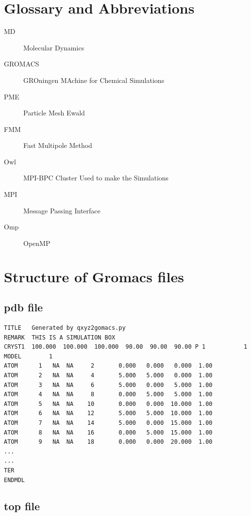 \documentclass[12pt,twoside,a4paper]{report}
\begin{document}
\begin{appendices}
\chapter{Glossary and Abbreviations}

\begin{description}


\item[MD]  Molecular Dynamics
\item[GROMACS] GROningen MAchine for Chemical Simulations
\item[PME] Particle Mesh Ewald
\item[FMM] Fast Multipole Method
\item[Owl] MPI-BPC Cluster Used to make the Simulations

\item[MPI] Message Passing Interface
\item[Omp] OpenMP

\end{description}


\chapter{Structure of Gromacs files}

\section{pdb file}

\begin{verbatim}
TITLE	Generated by qxyz2gomacs.py
REMARK	THIS IS A SIMULATION BOX
CRYST1  100.000  100.000  100.000  90.00  90.00  90.00 P 1           1
MODEL        1
ATOM      1   NA  NA     2       0.000   0.000   0.000  1.00
ATOM      2   NA  NA     4       5.000   5.000   0.000  1.00
ATOM      3   NA  NA     6       5.000   0.000   5.000  1.00
ATOM      4   NA  NA     8       0.000   5.000   5.000  1.00
ATOM      5   NA  NA    10       0.000   0.000  10.000  1.00
ATOM      6   NA  NA    12       5.000   5.000  10.000  1.00
ATOM      7   NA  NA    14       5.000   0.000  15.000  1.00
ATOM      8   NA  NA    16       0.000   5.000  15.000  1.00
ATOM      9   NA  NA    18       0.000   0.000  20.000  1.00
...
...
TER
ENDMDL
\end{verbatim}

\section{top file}



\end{appendices}
\end{document}
